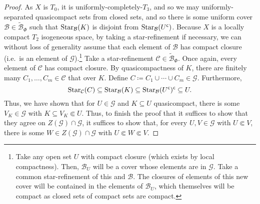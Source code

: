 \begin{thm}
\begin{proof}
As $X$ is $T_0$, it is uniformly-completely-$T_3$, and so we may uniformly-separated quasicompact sets from closed sets, and so there is some uniform cover $\mathcal{B}\in \widetilde{\mathcal{B}}_\Phi$ such that $\operatorname{Star} _{\mathcal{B}}(K)$ is disjoint from $\operatorname{Star} _{\mathcal{B}}(U^{\mathsf{c}})$.  Because $X$ is a locally compact $T_2$ isogeneous space, by taking a star-refinement if necessary, we can without loss of generality assume that each element of $\mathcal{B}$ has compact closure (i.e.~is an element of $\mathcal{G}$).\footnote{Take any open set $U$ with compact closure (which exists by local compactness).  Then, $\mathcal{B}_U$ will be a cover whose elements are in $\mathcal{G}$.  Take a common star-refinement of this and $\mathcal{B}$.  The closures of elements of this new cover will be contained in the elements of $\mathcal{B}_U$, which themselves will be compact as closed sets of compact sets are compact.}  Take a star-refinement $\mathcal{C}\in \widetilde{\mathcal{B}}_{\Phi}$.  Once again, every element of $\mathcal{C}$ has compact closure.  By quasicompactness of $K$, there are finitely many $C_1,\ldots ,C_m\in \mathcal{C}$ that over $K$.  Define $C\coloneqq C_1\cup \cdots \cup C_m\in \mathcal{G}$.  Furthermore,
\begin{equation}
\operatorname{Star} _{\mathcal{C}}(C)\subseteq \operatorname{Star} _{\mathcal{B}}(K)\subseteq \operatorname{Star} _{\mathcal{B}}(U^{\mathsf{c}})^{\mathsf{c}}\subseteq U.
\end{equation}
Thus, we have shown that for $U\in \mathcal{G}$ and $K\subseteq U$ quasicompact, there is some $V_K\in \mathcal{G}$ with $K\subseteq V_K\Subset U$.  Thus, to finish the proof that it suffices to show that they agree on $Z(\mathcal{G})\cap \mathcal{G}$, it suffices to show that, for every $U,V\in \mathcal{G}$ with $U\Subset V$, there is some $W\in Z(\mathcal{G})\cap \mathcal{G}$ with $U\Subset W\Subset V$.


\end{proof}
\end{thm}
